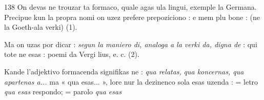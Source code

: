 \begin{VUpage}[142]{138}
On devas ne trouzar ta formaco, quale agas ula lingui,\nl
exemple la Germana. Precipue kun la propra nomi on uzez\nl
prefere prepoziciono :  e mem plu bone :\nl
{} (ne la Goeth-ala verki) (1).

Ma on uzas  por dicar : \textit{segun la maniero di, analoga}\nl
\textit{a la verki da, digna de} : \nl
{} qui tote ne esas : poemi da Vergi\cc
lius, e. c. (2).

Kande l'adjektivo formacenda signifikas ne : \textit{qua relatas,}\nl
\textit{qua koncernas, qua apartenas a...} ma « qua esas... », lore\nl
nur la dezinenco  sola esas uzenda :  =\nl
letro \textit{qua esas} respondo;  = parolo \textit{qua esas}\parplein
\end{VUpage}

